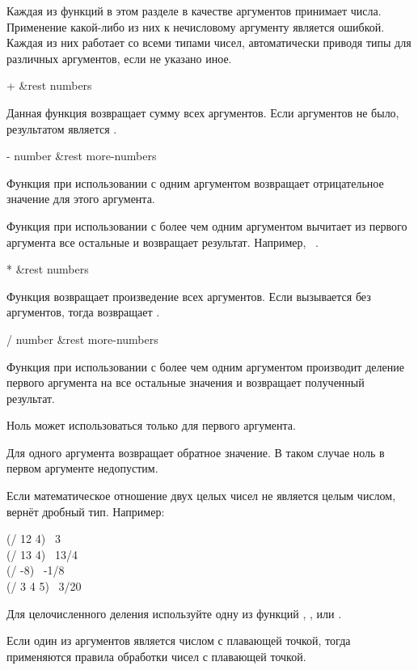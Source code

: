 Каждая из функций в этом разделе в качестве аргументов принимает числа. Применение
какой-либо из них к нечисловому аргументу является ошибкой. Каждая из них
работает со всеми типами чисел, автоматически приводя типы для различных
аргументов, если не указано иное.

\begin{defun}[Функция]
+ &rest numbers

Данная функция возвращает сумму всех аргументов. Если аргументов не было,
результатом является .
\end{defun}

\begin{defun}[Функция]
- number &rest more-numbers

Функция \cdf{-} при использовании с одним аргументом возвращает отрицательное
значение для этого аргумента.

Функция \cdf{-} при использовании с более чем одним аргументом вычитает из
первого аргумента все остальные и возвращает результат.
Например,  \EV\ .
\end{defun}

\begin{defun}[Функция]
* &rest numbers

Функция возвращает произведение всех аргументов.
Если вызывается без аргументов, тогда возвращает .
\end{defun}

\begin{defun}[Функция]
/ number &rest more-numbers

Функция \cdf{/} при использовании с более чем одним аргументом производит
деление первого аргумента на все остальные значения и возвращает полученный
результат.

Ноль может использоваться только для первого аргумента.

Для одного аргумента \cdf{/} возвращает обратное значение. В таком случае ноль в
первом аргументе недопустим.

Если математическое отношение двух целых
чисел не является целым числом, \cdf{/} вернёт дробный тип. 
Например:
\begin{lisp}
(/ 12 4) \EV\ 3 \\
(/ 13 4) \EV\ 13/4 \\
(/ -8) \EV\ -1/8 \\
(/ 3 4 5) \EV\ 3/20
\end{lisp}

Для целочисленного деления используйте одну из функций  
, , 
или .

Если один из аргументов является числом с плавающей точкой, тогда применяются
правила обработки чисел с плавающей точкой.
\end{defun}

